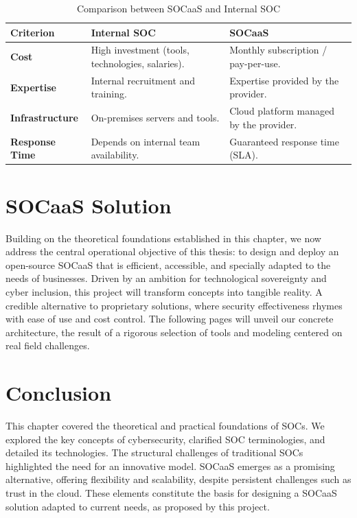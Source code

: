 \begin{table}[H]
\centering
\caption{Comparison between SOCaaS and Internal SOC}
\label{tab:socaas-vs-internal}
\renewcommand{\arraystretch}{1.4}
\begin{tabular}{>{\raggedright\arraybackslash}p{3cm} p{5cm} p{5cm}}
\toprule
\rowcolor{tableheader}
\textbf{Criterion} & \textbf{Internal SOC} & \textbf{SOCaaS} \\
\midrule
\textbf{Cost} & High investment (tools, technologies, salaries). & Monthly subscription / pay-per-use. \\
\midrule
\textbf{Expertise} & Internal recruitment and training. & Expertise provided by the provider. \\
\midrule
\textbf{Infrastructure} & On-premises servers and tools. & Cloud platform managed by the provider. \\
\midrule
\textbf{Response Time} & Depends on internal team availability. & Guaranteed response time (SLA). \\
\bottomrule
\end{tabular}
\end{table}

\section{SOCaaS Solution}
\label{sec:socaas-solution}

Building on the theoretical foundations established in this chapter, we now address the central operational objective of this thesis: to design and deploy an open-source SOCaaS that is efficient, accessible, and specially adapted to the needs of businesses. Driven by an ambition for technological sovereignty and cyber inclusion, this project will transform concepts into tangible reality. A credible alternative to proprietary solutions, where security effectiveness rhymes with ease of use and cost control. The following pages will unveil our concrete architecture, the result of a rigorous selection of tools and modeling centered on real field challenges.

\section{Conclusion}
\label{sec:conclusion}

This chapter covered the theoretical and practical foundations of SOCs. We explored the key concepts of cybersecurity, clarified SOC terminologies, and detailed its technologies. The structural challenges of traditional SOCs highlighted the need for an innovative model. SOCaaS emerges as a promising alternative, offering flexibility and scalability, despite persistent challenges such as trust in the cloud. These elements constitute the basis for designing a SOCaaS solution adapted to current needs, as proposed by this project.

